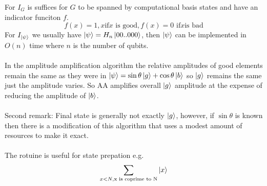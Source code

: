 \documentclass{article}
\begin{document}
{For $I_G$ is suffices for $G$ to be spanned by computational basis states and have an indicator funciton $f$.
$$
f(x) = 1, x \text{if} x\text{ is good}, f(x) = 0 \text{ if} x \text{is bad}
$$
For $I_{\ket{\psi}}$ we usually have $\ket{\psi} = H_n \ket{00..000}$, then $\ket{\psi}$ can be implemented in $O(n)$ time where $n$ is the number of qubits.\\\\
In the amplitude amplification algorithm the relative amplitudes of good elements remain the same as they were in $\ket{\psi} = \sin \theta \ket{g} + \cos \theta \ket{b}$ so $\ket{g}$ remains the same just the amplitude varies. So AA amplifies overall $\ket{g}$ amplitude at the expense of reducing the amplitude of $\ket{b}$.\\\\
Second remark: Final state is generally not exactly $\ket{g}$, however, if $\sin \theta$ is known then there is a modification of this algorithm that uses a modest amount of resources to make it exact.\\\\
The rotuine is useful for state prepation e.g.
$$
\sum_{x < N, \text{x is coprime to N}} \ket{x}
$$
}
\end{document}
